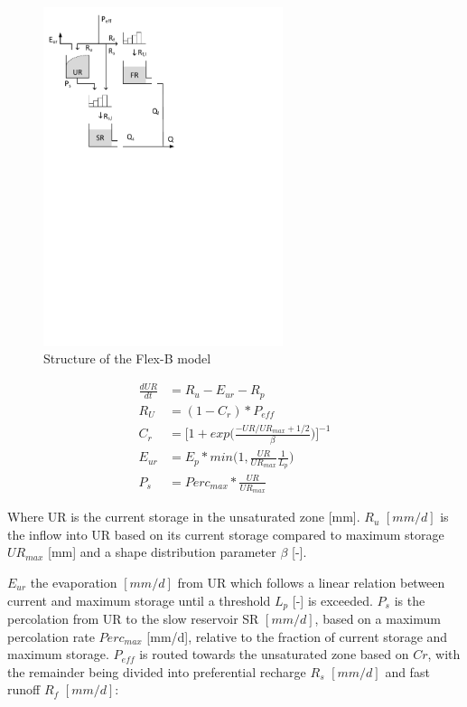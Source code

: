 { 																	%
\begin{figure}
\includegraphics[trim=1cm 17.5cm 7cm 1cm,width=7cm,keepaspectratio]{./files/21_schematic.pdf}
\caption{Structure of the Flex-B model} \label{fig:21_schematic}
\end{figure}

\begin{align}
	\frac{dUR}{dt} &= R_u - E_{ur} - R_p \\
	R_U &= (1 - C_r) * P_{eff}\\
	C_r &= \Big[1+exp\Big(\frac{-UR/UR_{max} + 1/2}{\beta}\Big)\Big]^{-1}\\
	E_{ur} &= E_p * min\Big(1, \frac{UR}{UR_{max}} \frac{1}{L_p}\Big)\\
	P_s&= Perc_{max} * \frac{UR}{UR_{max}}
\end{align}
  
Where UR is the current storage in the unsaturated zone [mm]. $R_u$ $[mm/d]$ is the inflow into UR based on its current storage compared to maximum storage $UR_{max}$ [mm] and a shape distribution parameter $\beta$ [-]. 

} %

$E_{ur}$ the evaporation $[mm/d]$ from UR which follows a linear relation between current and maximum storage until a threshold $L_p$ [-] is exceeded. $P_s$ is the percolation from UR to the slow reservoir SR $[mm/d]$, based on a maximum percolation rate $Perc_{max}$ [mm/d], relative to the fraction of current storage and maximum storage. $P_{eff}$ is routed towards the unsaturated zone based on $Cr$, with the remainder being divided into preferential recharge $R_s$ $[mm/d]$ and fast runoff $R_f$ $[mm/d]$:

